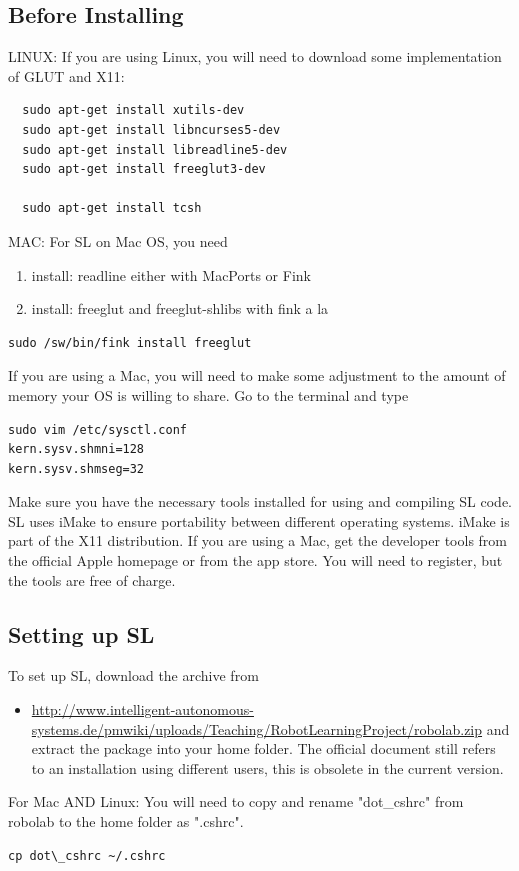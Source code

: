 \documentclass[11pt, article, colorback]{article}
\begin{document}
\subsection{Before Installing}
LINUX:
If you are using Linux, you will need to download some implementation of GLUT and X11:
\begin{lstlisting}
  sudo apt-get install xutils-dev
  sudo apt-get install libncurses5-dev 
  sudo apt-get install libreadline5-dev 
  sudo apt-get install freeglut3-dev
   
  sudo apt-get install tcsh
\end{lstlisting} 
%
MAC: For SL on Mac OS, you need
\begin{enumerate}
  \item install: readline either with MacPorts or Fink
  \item install: freeglut and freeglut-shlibs with fink a la
\end{enumerate}
\begin{lstlisting} 
sudo /sw/bin/fink install freeglut 
\end{lstlisting} 
%
If you are using a Mac, you will need to make some adjustment to the amount of memory your OS is willing to share. Go to the terminal and type

\begin{lstlisting} 
sudo vim /etc/sysctl.conf 
kern.sysv.shmni=128
kern.sysv.shmseg=32
\end{lstlisting}
%
Make sure you have the necessary tools installed for using and compiling SL code. SL uses iMake to ensure portability between different operating systems. iMake is part of the X11 distribution. If you are using a Mac, get the developer tools from the official Apple homepage or from the app store. You will need to register, but the tools are free of charge.

\subsection{Setting up SL}
To set up SL, download the archive from 
\begin{itemize}
  \item \url{http://www.intelligent-autonomous-systems.de/pmwiki/uploads/Teaching/RobotLearningProject/robolab.zip}
and extract the package into your home folder. The official document still refers to an installation using different users, this is obsolete in the current version.
\end{itemize}
%
For Mac AND Linux: You will need to copy and rename "dot\_cshrc" from robolab to the home folder as ".cshrc".
\begin{lstlisting}  
cp dot\_cshrc ~/.cshrc 
\end{lstlisting} 
\end{document}
